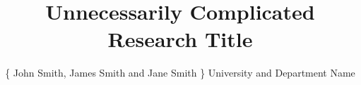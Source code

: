 \usepackage{graphicx}
    \graphicspath{{figures/}}
\usepackage{amsmath}
\usepackage{amssymb}
\usepackage{booktabs} %
\usepackage{enumitem} %
\usepackage{palatino} %
\usepackage[font=small,labelfont=bf]{caption} %
\usepackage{multicol}
    \setlength{\columnsep}{1.5em} %
    \setlength{\columnseprule}{0mm} %
\usepackage{tikz} %
    \usetikzlibrary{shapes,arrows} %







\newcommand{\compresslist}{%
\setlength{\itemsep}{1pt}
\setlength{\parskip}{0pt}
\setlength{\parsep}{0pt}
}




\title{Unnecessarily Complicated Research Title}
\author{\{ John Smith, James Smith and Jane Smith \} \hspace{12pt} University and Department Name}

